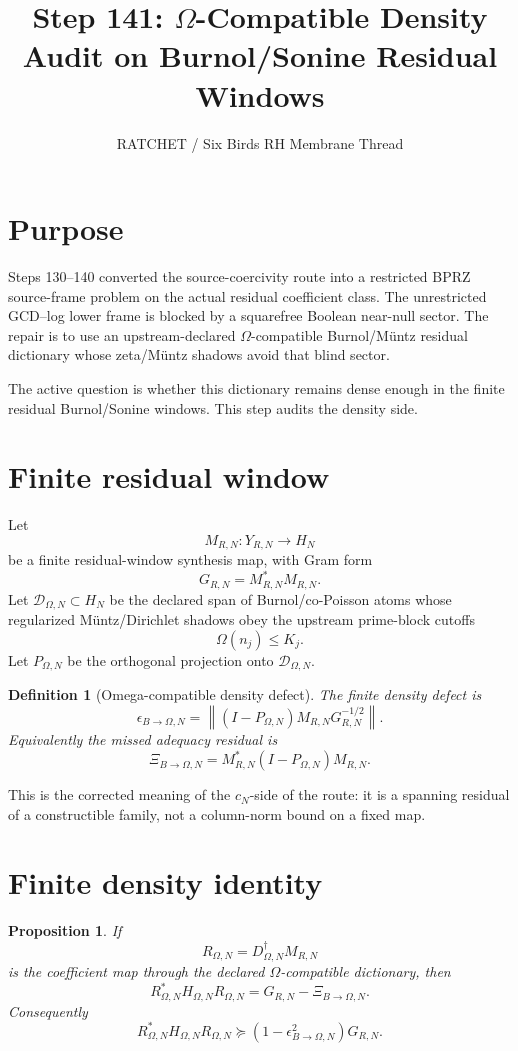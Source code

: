 \documentclass[11pt]{article}
\title{Step 141: $\Omega$-Compatible Density Audit on Burnol/Sonine Residual Windows}
\author{RATCHET / Six Birds RH Membrane Thread}
\date{}
\newtheorem{definition}{Definition}
\newtheorem{proposition}{Proposition}
\begin{document}
\maketitle

\section{Purpose}
Steps 130--140 converted the source-coercivity route into a restricted BPRZ source-frame problem on the actual residual coefficient class.  The unrestricted GCD--log lower frame is blocked by a squarefree Boolean near-null sector.  The repair is to use an upstream-declared $\Omega$-compatible Burnol/M\"untz residual dictionary whose zeta/M\"untz shadows avoid that blind sector.

The active question is whether this dictionary remains dense enough in the finite residual Burnol/Sonine windows.  This step audits the density side.

\section{Finite residual window}
Let
\[
M_{R,N}:Y_{R,N}\to H_N
\]
be a finite residual-window synthesis map, with Gram form
\[
G_{R,N}=M_{R,N}^{*}M_{R,N}.
\]
Let $\mathcal D_{\Omega,N}\subset H_N$ be the declared span of Burnol/co-Poisson atoms whose regularized M\"untz/Dirichlet shadows obey the upstream prime-block cutoffs
\[
\Omega(n_j)\le K_j.
\]
Let $P_{\Omega,N}$ be the orthogonal projection onto $\mathcal D_{\Omega,N}$.

\begin{definition}[Omega-compatible density defect]
The finite density defect is
\[
\boxed{
\epsilon_{B\to\Omega,N}
=
\left\|(I-P_{\Omega,N})M_{R,N}G_{R,N}^{-1/2}\right\|.
}
\]
Equivalently the missed adequacy residual is
\[
\boxed{
\Xi_{B\to\Omega,N}
=
M_{R,N}^{*}(I-P_{\Omega,N})M_{R,N}.
}
\]
\end{definition}

This is the corrected meaning of the $c_N$-side of the route: it is a spanning residual of a constructible family, not a column-norm bound on a fixed map.

\section{Finite density identity}
\begin{proposition}
If
\[
R_{\Omega,N}=D_{\Omega,N}^{\dagger}M_{R,N}
\]
is the coefficient map through the declared $\Omega$-compatible dictionary, then
\[
R_{\Omega,N}^{*}H_{\Omega,N}R_{\Omega,N}
=
G_{R,N}-\Xi_{B\to\Omega,N}.
\]
Consequently
\[
\boxed{
R_{\Omega,N}^{*}H_{\Omega,N}R_{\Omega,N}
\succeq
(1-\epsilon_{B\to\Omega,N}^{2})G_{R,N}.
}
\]
\end{proposition}
\end{document}
